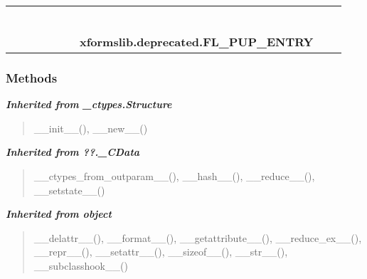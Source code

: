     \label{xformslib:deprecated:FL_PUP_ENTRY}
\begin{tabular}{cccccccccc}
\multicolumn{2}{r}{\settowidth{\BCL}{object}\multirow{2}{\BCL}{object}}
&&
&&
&&
  \\\cline{3-3}
  &&\multicolumn{1}{c|}{}
&&
&&
&&
  \\
\multicolumn{4}{r}{\settowidth{\BCL}{??.\_CData}\multirow{2}{\BCL}{??.\_CData}}
&&
&&
  \\\cline{5-5}
  &&&&\multicolumn{1}{c|}{}
&&
&&
  \\
\multicolumn{6}{r}{\settowidth{\BCL}{\_ctypes.Structure}\multirow{2}{\BCL}{\_ctypes.Structure}}
&&
  \\\cline{7-7}
  &&&&&&\multicolumn{1}{c|}{}
&&
  \\
&&&&&&\multicolumn{2}{l}{\textbf{xformslib.deprecated.FL\_PUP\_ENTRY}}
\end{tabular}



  \subsubsection{Methods}


\large{\textbf{\textit{Inherited from \_ctypes.Structure}}}

\begin{quote}
\_\_init\_\_(), \_\_new\_\_()
\end{quote}

\large{\textbf{\textit{Inherited from ??.\_CData}}}

\begin{quote}
\_\_ctypes\_from\_outparam\_\_(), \_\_hash\_\_(), \_\_reduce\_\_(), \_\_setstate\_\_()
\end{quote}

\large{\textbf{\textit{Inherited from object}}}

\begin{quote}
\_\_delattr\_\_(), \_\_format\_\_(), \_\_getattribute\_\_(), \_\_reduce\_ex\_\_(), \_\_repr\_\_(), \_\_setattr\_\_(), \_\_sizeof\_\_(), \_\_str\_\_(), \_\_subclasshook\_\_()
\end{quote}

